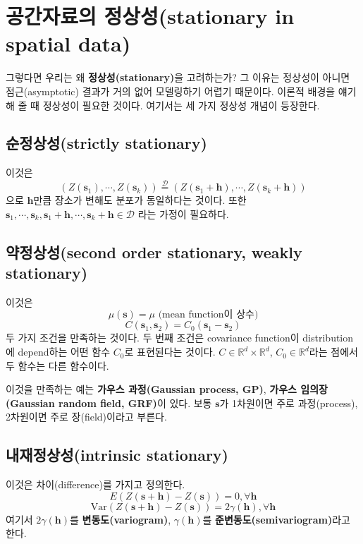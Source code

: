 \documentclass[b5paper,]{book}
\theoremstyle{definition}
\theoremstyle{definition}
\theoremstyle{definition}
\theoremstyle{remark}
\begin{document}
\section{공간자료의 정상성(stationary in spatial
data)}\label{-stationary-in-spatial-data}

그렇다면 우리는 왜 \textbf{정상성(stationary)}을 고려하는가? 그 이유는
정상성이 아니면 점근(asymptotic) 결과가 거의 없어 모델링하기 어렵기
때문이다. 이론적 배경을 얘기해 줄 때 정상성이 필요한 것이다. 여기서는 세
가지 정상성 개념이 등장한다.

\subsection{순정상성(strictly stationary)}\label{strictly-stationary}

이것은
\[(Z(\mathbf{s}_{1}), \cdots , Z(\mathbf{s}_{k})) \stackrel{\mathcal{D}}{=} (Z(\mathbf{s}_{1}+\mathbf{h}), \cdots , Z(\mathbf{s}_{k}+\mathbf{h}))\]
으로 \(\mathbf{h}\)만큼 장소가 변해도 분포가 동일하다는 것이다. 또한
\(\mathbf{s}_{1}, \cdots , \mathbf{s}_{k}, \mathbf{s}_{1}+\mathbf{h}, \cdots , \mathbf{s}_{k}+\mathbf{h} \in \mathcal{D}\)
라는 가정이 필요하다.

\subsection{약정상성(second order stationary, weakly
stationary)}\label{second-order-stationary-weakly-stationary}

이것은 \[\mu(\mathbf{s})=\mu \text{ (mean function이 상수)}\]
\[C(\mathbf{s}_{1},\mathbf{s}_{2})=C_{0}(\mathbf{s}_{1}-\mathbf{s}_{2})\]
두 가지 조건을 만족하는 것이다. 두 번째 조건은 covariance function이
distribution에 depend하는 어떤 함수 \(C_{0}\)로 표현된다는 것이다.
\(C \in \mathbb{R}^{d}\times \mathbb{R}^{d}\),
\(C_{0} \in \mathbb{R}^{d}\)라는 점에서 두 함수는 다른 함수이다.

이것을 만족하는 예는 \textbf{가우스 과정(Gaussian process, GP)},
\textbf{가우스 임의장(Gaussian random field, GRF)}이 있다. 보통
\(\mathbf{s}\)가 1차원이면 주로 과정(process), 2차원이면 주로
장(field)이라고 부른다.

\subsection{내재정상성(intrinsic
stationary)}\label{intrinsic-stationary}

이것은 차이(difference)를 가지고 정의한다.
\[E(Z(\mathbf{s}+\mathbf{h})-Z(\mathbf{s}))=0, \forall \mathbf{h}\]
\[\text{Var}(Z(\mathbf{s}+\mathbf{h})-Z(\mathbf{s}))=2\gamma(\mathbf{h}), \forall \mathbf{h}\]
여기서 \(2\gamma(\mathbf{h})\)를 \textbf{변동도(variogram)},
\(\gamma(\mathbf{h})\)를 \textbf{준변동도(semivariogram)}라고 한다.
\end{document}
